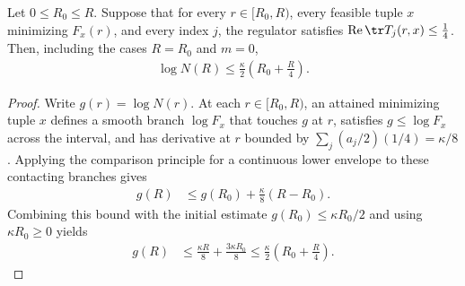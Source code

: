 \begin{lemma}
    \label{thm:peps_patch_minimum_growth_regulator}
    \leanok
    Let $0\le R_0\le R$.
    Suppose that for every $r\in[R_0,R)$, every feasible tuple $x$ minimizing
    $F_x(r)$, and every index $j$, the regulator satisfies
    $\operatorname{Re}\tr T_j(r,x)\le\tfrac14$.
    Then, including the cases $R=R_0$ and $m=0$,
    \begin{align*}
        \log N(R)\le\frac{\kappa}{2}\left(R_0+\frac R4\right).
    \end{align*}
\end{lemma}
\begin{proof}\leanok
    Write $g(r)=\log N(r)$. At each $r\in[R_0,R)$, an attained minimizing tuple
    $x$ defines a smooth branch $\log F_x$ that touches $g$ at $r$, satisfies
    $g\le\log F_x$ across the interval, and has derivative at $r$ bounded by
    $\sum_j(a_j/2)(1/4)=\kappa/8$.
    Applying the comparison principle for a continuous lower envelope to these
    contacting branches gives
    \begin{align*}
        g(R) & \le g(R_0)+\frac{\kappa}{8}(R-R_0).
    \end{align*}
    Combining this bound with the initial estimate $g(R_0)\le\kappa R_0/2$ and
    using $\kappa R_0\ge0$ yields
    \begin{align*}
        g(R) & \le\frac{\kappa R}{8}+\frac{3\kappa R_0}{8}
        \le\frac{\kappa}{2}\left(R_0+\frac R4\right).
    \end{align*}
\end{proof}

